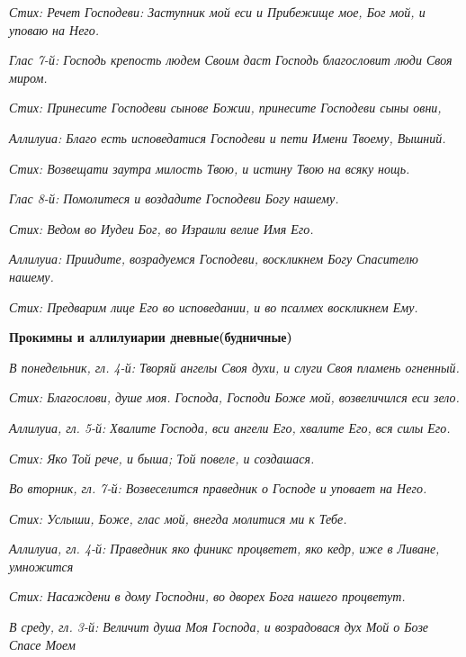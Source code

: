 \itshape Стих:\normalfont{} Речет Господеви: Заступник мой еси и Прибежище мое, Бог мой, и уповаю на Него.


\itshape Глас 7-й:\normalfont{} Господь крепость людем Своим даст Господь благословит люди Своя миром.


\itshape Стих:\normalfont{} Принесите Господеви сынове Божии, принесите Господеви сыны овни,


\itshape Аллилуиа:\normalfont{} Благо есть исповедатися Господеви и пети Имени Твоему, Вышний.


\itshape Стих:\normalfont{} Возвещати заутра милость Твою, и истину Твою на всяку нощь.


\itshape Глас 8-й:\normalfont{} Помолитеся и воздадите Господеви Богу нашему.


\itshape Стих:\normalfont{} Ведом во Иудеи Бог, во Израили велие Имя Его.


\itshape Аллилуиа:\normalfont{} Приидите, возрадуемся Господеви, воскликнем Богу Спасителю нашему.


\itshape Стих:\normalfont{} Предварим лице Его во исповедании, и во псалмех воскликнем Ему.




\medskip
\bfseries Прокимны и аллилуиарии дневные(будничные)\normalfont{}


\itshape В понедельник, гл. 4-й:\normalfont{} Творяй ангелы Своя духи, и слуги Своя пламень огненный.


\itshape Стих:\normalfont{} Благослови, душе моя. Господа, Господи Боже мой, возвеличился еси зело.


\itshape Аллилуиа, гл. 5-й:\normalfont{} Хвалите Господа, вси ангели Его, хвалите Его, вся силы Его.


\itshape Стих:\normalfont{} Яко Той рече, и быша; Той повеле, и создашася.


\itshape Во вторник, гл. 7-й:\normalfont{} Возвеселится праведник о Господе и уповает на Него.


\itshape Стих:\normalfont{} Услыши, Боже, глас мой, внегда молитися ми к Тебе.


\itshape Аллилуиа, гл. 4-й:\normalfont{} Праведник яко финикс процветет, яко кедр, иже в Ливане, умножится


\itshape Стих:\normalfont{} Насаждени в дому Господни, во дворех Бога нашего процветут.


\itshape В сред\normalfont{}у\itshape , гл. 3-й:\normalfont{} Величит душа Моя Господа, и возрадовася дух Мой о Бозе Спасе Моем


